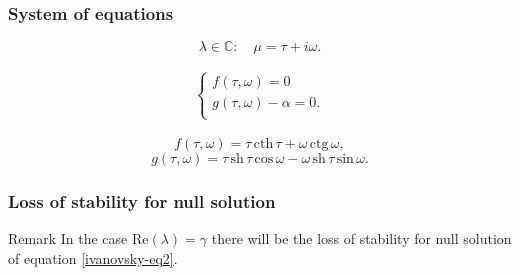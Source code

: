 \documentclass[fullscreen=true, unicode, bookmarks=false]{beamer}
\begin{document}
\begin{frame}
\frametitle{ System of equations }
	
$$ \lambda \in \mathbb{C}: \quad \mu = \tau + i \omega. $$

\bigskip

\begin{equation}\label{ivanovsky-eq3}
\begin{array}{l}
\begin{cases}
f(\tau, \omega) = 0 \\
g(\tau, \omega) - \alpha = 0. \\
\end{cases}
\end{array}
\end{equation}

\bigskip

$$ f(\tau, \omega) = \tau\,\mbox{cth}\,\tau + \omega\,\mbox{ctg}\,\omega, $$
$$ g(\tau, \omega) = \tau\,\mbox{sh}\,\tau\,\mbox{cos}\,\omega - \omega\,\mbox{sh}\,\tau\,\mbox{sin}\,\omega. $$

\end{frame}

\begin{frame}
\frametitle{ Loss of stability for null solution }
	
\begin{block}{ Remark }
In the case $ \mbox{Re}(\lambda) = \gamma $  there will be the loss of stability for null solution of equation \eqref{ivanovsky-eq2}.
\end{block}

\end{frame}
\end{document}
